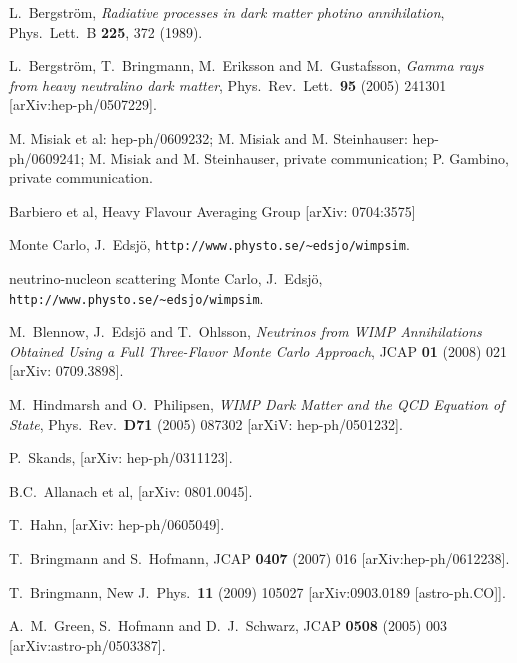\begin{thebibliography}{99}
  L.~Bergstr\"om,
  \emph{Radiative processes in dark matter photino annihilation},
  Phys.\ Lett.\  B {\bf 225}, 372 (1989).

  L.~Bergstr\"om, T.~Bringmann, M.~Eriksson and M.~Gustafsson,
  \emph{Gamma rays from heavy neutralino dark matter},
  Phys.\ Rev.\ Lett.\  {\bf 95} (2005) 241301
  [arXiv:hep-ph/0507229].



M. Misiak et al: hep-ph/0609232;
M. Misiak and M. Steinhauser: hep-ph/0609241;
M. Misiak and M. Steinhauser, private communication;
P. Gambino, private communication.

Barbiero et al, Heavy Flavour Averaging Group [arXiv: 0704:3575]

 Monte Carlo, J.~Edsj\"o, \texttt{http://www.physto.se/\~{ }edsjo/wimpsim}.

 neutrino-nucleon scattering Monte Carlo, J.~Edsj\"o, \texttt{http://www.physto.se/\~{ }edsjo/wimpsim}.

M.~Blennow, J.~Edsj\"o and T.~Ohlsson, \emph{Neutrinos from WIMP Annihilations Obtained Using a Full Three-Flavor Monte Carlo Approach}, JCAP {\bf 01} (2008) 021 [arXiv: 0709.3898].

M.~Hindmarsh and O.~Philipsen, \emph{WIMP Dark Matter and the QCD Equation of State}, Phys.\ Rev.\ {\bfseries D71} (2005) 087302 [arXiV: hep-ph/0501232].

P.~Skands, [arXiv: hep-ph/0311123].

B.C.~Allanach et al, [arXiv: 0801.0045].

T.~Hahn, [arXiv: hep-ph/0605049].

  T.~Bringmann and S.~Hofmann,
  JCAP {\bf 0407} (2007) 016
  [arXiv:hep-ph/0612238].

  T.~Bringmann,
  New J.\ Phys.\  {\bf 11} (2009) 105027
  [arXiv:0903.0189 [astro-ph.CO]].

  A.~M.~Green, S.~Hofmann and D.~J.~Schwarz,
  JCAP {\bf 0508} (2005) 003
  [arXiv:astro-ph/0503387].


\end{thebibliography}
